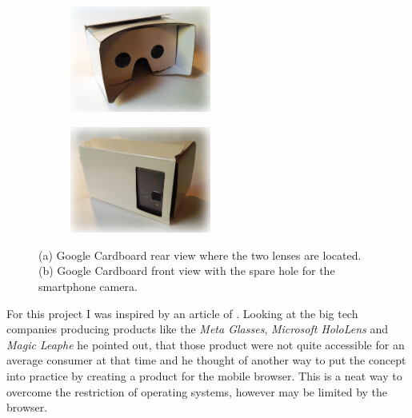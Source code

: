 \begin{figure}
	\begin{subfigure}[t]{0.45\textwidth}
		\centering
		\includegraphics[height = 3.5cm]{Document/Figures/chapter1/GoogleCardboardRearView}
		\caption{}
		\label{fig:Google Cardboard a}
	\end{subfigure}
	\hfill
	\begin{subfigure}[t]{0.45\textwidth}
		\centering
		\includegraphics[height = 3.5cm]{Document/Figures/chapter1/GoogleCardboardFrontView}
		\caption{}
		\label{fig:Google Cardboard b}
	\end{subfigure}
	\caption[Google Cardboard with smartphone]
			{(a) Google Cardboard rear view where the two lenses are located.
			 (b) Google Cardboard front view with the spare hole for the smartphone camera.}
        \label{fig:Google Cardboard}
\end{figure}



For this project I was inspired by an article of \cite{Catanzariti2015AugmentedSitePoint}. Looking at the big tech companies producing products like the \textit{Meta Glasses}, \textit{Microsoft HoloLens} and \textit{Magic Leaphe} he pointed out, that those product were not quite accessible for an average consumer at that time and he thought of another way to put the concept into practice by creating a product for the mobile browser. This is a neat way to overcome the restriction of operating systems, however may be limited by the browser.

